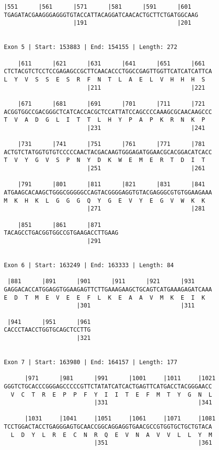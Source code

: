 \documentclass{article}
\begin{document}
\begin{Verbatim}
|551      |561      |571      |581      |591      |601  
TGAGATACGAAGGGAGGGTGTACCATTACAGGATCAACACTGCTTCTGATGGCAAG
                    |191                          |201  
  
 
Exon 5 | Start: 153883 | End: 154155 | Length: 272
 
    |611      |621      |631      |641      |651      |661  
CTCTACGTCTCCTCCGAGAGCCGCTTCAACACCCTGGCCGAGTTGGTTCATCATCATTCA
L  Y  V  S  S  E  S  R  F  N  T  L  A  E  L  V  H  H  H  S  
                        |211                          |221  
  
    |671      |681      |691      |701      |711      |721  
ACGGTGGCCGACGGGCTCATCACCACGCTCCATTATCCAGCCCCAAAGCGCAACAAGCCC
T  V  A  D  G  L  I  T  T  L  H  Y  P  A  P  K  R  N  K  P  
                        |231                          |241  
  
    |731      |741      |751      |761      |771      |781  
ACTGTCTATGGTGTGTCCCCCAACTACGACAAGTGGGAGATGGAACGCACGGACATCACC
T  V  Y  G  V  S  P  N  Y  D  K  W  E  M  E  R  T  D  I  T  
                        |251                          |261  
  
    |791      |801      |811      |821      |831      |841  
ATGAAGCACAAGCTGGGCGGGGGCCAGTACGGGGAGGTGTACGAGGGCGTGTGGAAGAAA
M  K  H  K  L  G  G  G  Q  Y  G  E  V  Y  E  G  V  W  K  K  
                        |271                          |281  
  
    |851      |861      |871     
TACAGCCTGACGGTGGCCGTGAAGACCTTGAAG
                        |291     
  
 
Exon 6 | Start: 163249 | End: 163333 | Length: 84
 
 |881      |891      |901      |911      |921      |931     
GAGGACACCATGGAGGTGGAAGAGTTCTTGAAAGAAGCTGCAGTCATGAAAGAGATCAAA
E  D  T  M  E  V  E  E  F  L  K  E  A  A  V  M  K  E  I  K  
                     |301                          |311     
  
 |941      |951      |961
CACCCTAACCTGGTGCAGCTCCTTG
                     |321
  
 
Exon 7 | Start: 163980 | End: 164157 | Length: 177
 
      |971      |981      |991      |1001     |1011     |1021
GGGTCTGCACCCGGGAGCCCCCGTTCTATATCATCACTGAGTTCATGACCTACGGGAACC
  V  C  T  R  E  P  P  F  Y  I  I  T  E  F  M  T  Y  G  N  L
                          |331                          |341
  
      |1031     |1041     |1051     |1061     |1071     |1081
TCCTGGACTACCTGAGGGAGTGCAACCGGCAGGAGGTGAACGCCGTGGTGCTGCTGTACA
  L  D  Y  L  R  E  C  N  R  Q  E  V  N  A  V  V  L  L  Y  M
                          |351                          |361
  

\end{Verbatim}
\end{document}
